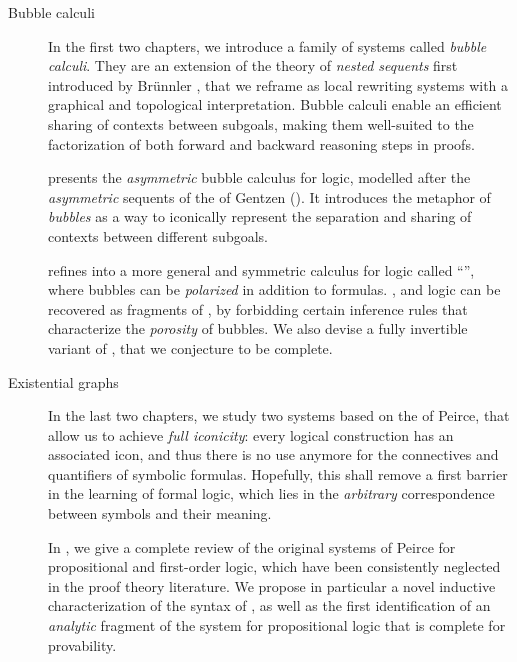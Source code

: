 \begin{description}
  \item[Bubble calculi] In the first two chapters, we introduce a family of
  systems called \emph{bubble calculi}. They are an extension of the theory of
  \emph{nested sequents} first introduced by Brünnler
  , that we reframe as local rewriting systems with
  a graphical and topological interpretation. Bubble calculi enable an efficient
  sharing of contexts between subgoals, making them well-suited to the
  factorization of both forward and backward reasoning steps in proofs.

   presents the \emph{asymmetric} bubble calculus  for
   logic, modelled after the \emph{asymmetric} sequents of the
     of Gentzen (). It
  introduces the metaphor of \emph{bubbles} as a way to iconically represent the
  separation and sharing of contexts between different subgoals.

   refines  into a more general and symmetric
  calculus for  logic called ``'', where bubbles can be
  \emph{polarized} in addition to formulas. , 
  and  logic can be recovered as fragments of ,
  by forbidding certain inference rules that characterize the \emph{porosity} of
  bubbles. We also devise a fully invertible variant of , that we
  conjecture to be complete.
  
  \item[Existential graphs] In the last two chapters, we study two systems based
  on the  of Peirce, that allow us to achieve \emph{full
  iconicity}: every logical construction has an associated icon, and thus there
  is no use anymore for the connectives and quantifiers of symbolic formulas.
  Hopefully, this shall remove a first barrier in the learning of formal logic,
  which lies in the \emph{arbitrary} correspondence between symbols and their
  meaning.

  In , we give a complete review of the original  systems of
  Peirce for propositional and first-order  logic, which have been
  consistently neglected in the proof theory literature. We propose in
  particular a novel inductive characterization of the syntax of , as
  well as the first identification of an \emph{analytic} fragment of the system
  for propositional logic that is complete for provability.


\end{description}
